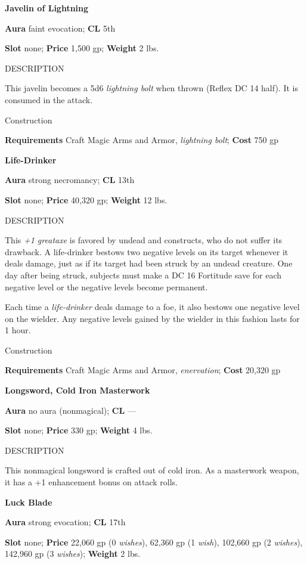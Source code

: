 \textbf{Javelin of Lightning}
				
\textbf{Aura} faint evocation; \textbf{CL} 5th
				
\textbf{Slot} none; \textbf{Price} 1,500 gp; \textbf{Weight} 2 lbs.
				
DESCRIPTION
				
This javelin becomes a 5d6 \textit{lightning bolt} when thrown (Reflex DC 14 half). It is consumed in the attack. 
				
Construction
				
\textbf{Requirements} Craft Magic Arms and Armor, \textit{lightning bolt}; \textbf{Cost }750 gp
				
\textbf{Life-Drinker}
				
\textbf{Aura} strong necromancy;\textbf{ CL }13th
				
\textbf{Slot} none; \textbf{Price} 40,320 gp; \textbf{Weight} 12 lbs.
				
DESCRIPTION
				
This \textit{+1 greataxe} is favored by undead and constructs, who do not suffer its drawback. A life-drinker bestows two negative levels on its target whenever it deals damage, just as if its target had been struck by an undead creature. One day after being struck, subjects must make a DC 16 Fortitude save for each negative level or the negative levels become permanent.
				
Each time a \textit{life-drinker} deals damage to a foe, it also bestows one negative level on the wielder. Any negative levels gained by the wielder in this fashion lasts for 1 hour. 
				
Construction
				
\textbf{Requirements} Craft Magic Arms and Armor, \textit{enervation}; \textbf{Cost }20,320 gp
				
\textbf{Longsword, Cold Iron Masterwork }
				
\textbf{Aura} no aura (nonmagical); \textbf{CL} ---
				
\textbf{Slot} none; \textbf{Price} 330 gp; \textbf{Weight} 4 lbs.
				
DESCRIPTION
				
This nonmagical longsword is crafted out of cold iron. As a masterwork weapon, it has a +1 enhancement bonus on attack rolls. 
				
\textbf{Luck Blade}
				
\textbf{Aura} strong evocation; \textbf{CL} 17th
				
\textbf{Slot} none; \textbf{Price} 22,060 gp (0 \textit{wishes}), 62,360 gp (1 \textit{wish}), 102,660 gp (2 \textit{wishes}), 142,960 gp (3 \textit{wishes}); \textbf{Weight} 2 lbs.
				
